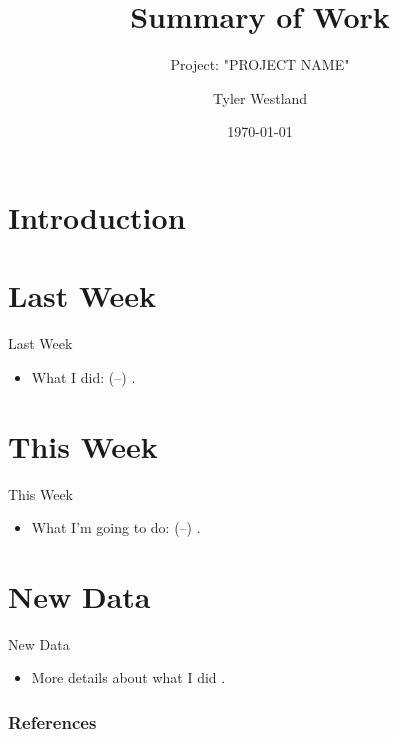 \documentclass[handout,8pt]{beamer}
\title{Summary of Work}
\subtitle{Project: "PROJECT NAME"}
\author[Tyler]{Tyler Westland}
\date{\today}
\newcommand{\prettycite}[1]{%
  \citetitle{#1} (\citejournal{#1}--\citeyear{#1})\cite{#1}
}
\begin{document}
    \section{Introduction}
    
    \begin{frame}
        \centering
        \titlepage
    \end{frame}

    \section{Last Week}
    \begin{frame}{Last Week}
      \begin{itemize}
        \item What I did: \prettycite{tylerWestlandPastResearch}.
      \end{itemize}
    \end{frame}

    \section{This Week}
    \begin{frame}{This Week}
      \begin{itemize}
        \item What I'm going to do:
          \prettycite{tylerWestlandFutureResearch}.
      \end{itemize}
    \end{frame}

    \section{New Data}
    \begin{frame}{New Data}
      \begin{itemize}
        \item More details about what I did
          \cite{tylerWestlandPastResearch}.
      \end{itemize}
    \end{frame}
    
    \begin{frame}[allowframebreaks]
      \frametitle{References}
      \printbibliography
    \end{frame}
\end{document}
